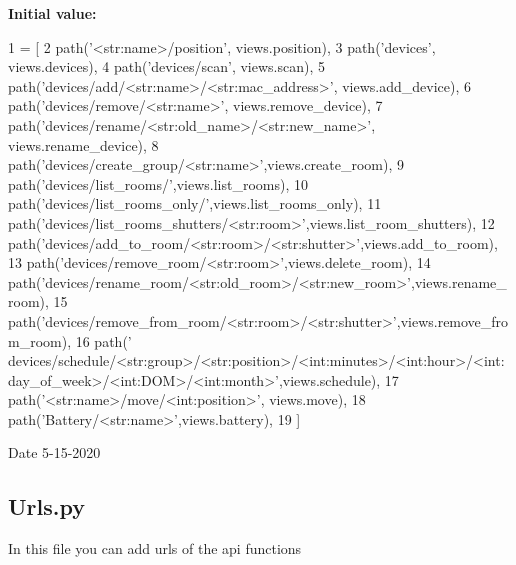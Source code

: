 {\bfseries Initial value\+:}
\begin{DoxyCode}
1 =  [
2     path(\textcolor{stringliteral}{'<str:name>/position'}, views.position),
3     path(\textcolor{stringliteral}{'devices'}, views.devices),
4     path(\textcolor{stringliteral}{'devices/scan'}, views.scan),
5     path(\textcolor{stringliteral}{'devices/add/<str:name>/<str:mac\_address>'}, views.add\_device),
6     path(\textcolor{stringliteral}{'devices/remove/<str:name>'}, views.remove\_device),
7     path(\textcolor{stringliteral}{'devices/rename/<str:old\_name>/<str:new\_name>'}, views.rename\_device),
8     path(\textcolor{stringliteral}{'devices/create\_group/<str:name>'},views.create\_room),
9     path(\textcolor{stringliteral}{'devices/list\_rooms/'},views.list\_rooms),
10     path(\textcolor{stringliteral}{'devices/list\_rooms\_only/'},views.list\_rooms\_only),
11     path(\textcolor{stringliteral}{'devices/list\_rooms\_shutters/<str:room>'},views.list\_room\_shutters),
12     path(\textcolor{stringliteral}{'devices/add\_to\_room/<str:room>/<str:shutter>'},views.add\_to\_room),
13     path(\textcolor{stringliteral}{'devices/remove\_room/<str:room>'},views.delete\_room),
14     path(\textcolor{stringliteral}{'devices/rename\_room/<str:old\_room>/<str:new\_room>'},views.rename\_room),
15     path(\textcolor{stringliteral}{'devices/remove\_from\_room/<str:room>/<str:shutter>'},views.remove\_from\_room),
16     path(\textcolor{stringliteral}{'
      devices/schedule/<str:group>/<str:position>/<int:minutes>/<int:hour>/<int:day\_of\_week>/<int:DOM>/<int:month>'},views.schedule),
17     path(\textcolor{stringliteral}{'<str:name>/move/<int:position>'}, views.move),
18     path(\textcolor{stringliteral}{'Battery/<str:name>'},views.battery),
19 ]
\end{DoxyCode}
\begin{DoxyDate}{Date}
5-\/15-\/2020 
\end{DoxyDate}
\hypertarget{namespacecontroller_1_1urls_intro_sec}{}\subsection{Urls.\+py}\label{namespacecontroller_1_1urls_intro_sec}
In this file you can add urls of the api functions 